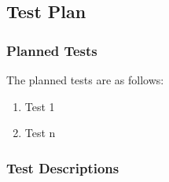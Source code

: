 
\pagebreak
\subsection{Test Plan}

\subsubsection{Planned Tests}
The planned tests are as follows:

\begin{enumerate}
   \item Test 1
   \item Test n
\end{enumerate}

\subsubsection{Test Descriptions}





